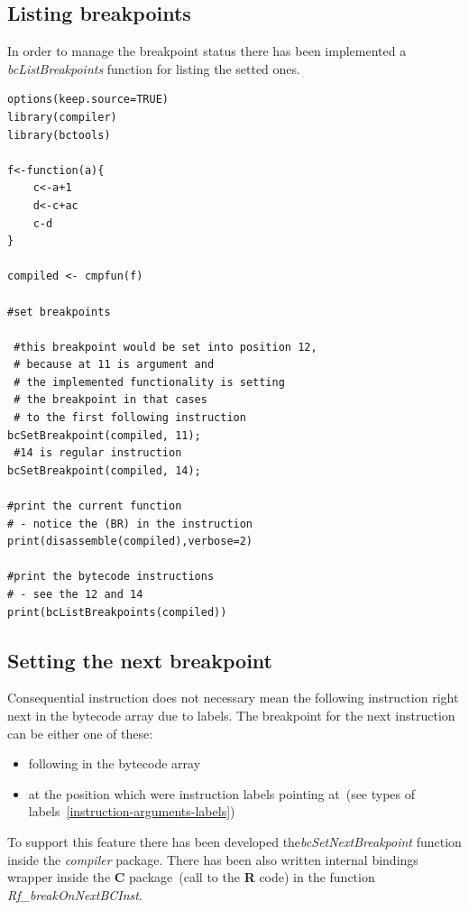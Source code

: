 \documentclass[thesis=M,english]{FITthesis}[2018/10/20]
\begin{document}
\subsection{Listing breakpoints}\label{listing-breakpoints}

In order to manage the breakpoint status there has been implemented a \textit{bcListBreakpoints} function for listing the setted ones.

\begin{lstlisting}
options(keep.source=TRUE)
library(compiler)
library(bctools)

f<-function(a){
    c<-a+1
    d<-c+ac
    c-d
}

compiled <- cmpfun(f)

#set breakpoints

 #this breakpoint would be set into position 12,
 # because at 11 is argument and 
 # the implemented functionality is setting 
 # the breakpoint in that cases 
 # to the first following instruction
bcSetBreakpoint(compiled, 11);
 #14 is regular instruction
bcSetBreakpoint(compiled, 14);

#print the current function 
# - notice the (BR) in the instruction
print(disassemble(compiled),verbose=2)

#print the bytecode instructions 
# - see the 12 and 14
print(bcListBreakpoints(compiled))
\end{lstlisting}

\subsection{Setting the next breakpoint}\label{setting-next-breakpoint}

Consequential instruction does not necessary mean the following instruction right next in the bytecode array due to labels. The breakpoint for the next instruction can be either one of these:

\begin{itemize}
	\item following in the bytecode array
	\item at the position which were instruction labels pointing at~(see types of labels~\ref{instruction-arguments-labels})
\end{itemize}

To support this feature there has been developed the\textit{bcSetNextBreakpoint} function inside the \textit{compiler} package. There has been also written internal bindings wrapper inside the \textbf{C} package~(call to the \textbf{R} code) in the function \textit{Rf{\_}breakOnNextBCInst}. 
\end{document}

